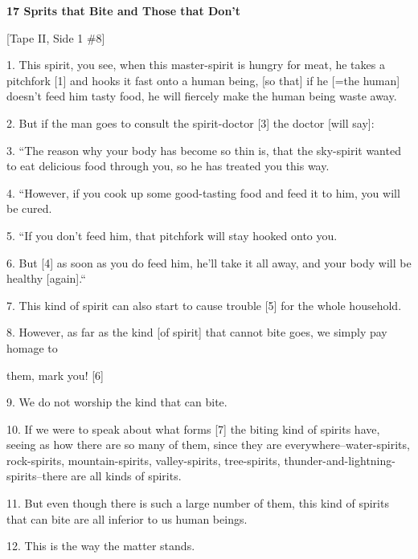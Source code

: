 
{\Large{}\textbf{17 Sprits that Bite and Those that Don't}}

{\Large{}[Tape II, Side 1 \#8]}

{\Large{}1. This spirit, you see, when this master-spirit is hungry for meat, he
takes a pitchfork [1] and hooks it fast onto a human being, [so that] if he [=the
human] doesn't feed him tasty food, he will fiercely make the human being waste
away.}

{\Large{}2. But if the man goes to consult the spirit-doctor [3] the doctor [will
say]:}

{\Large{}3. ``The reason why your body has become so thin is, that the
sky-spirit wanted to eat delicious food through you, so he has treated you this
way. }

{\Large{}4. ``However, if you cook up some good-tasting food and feed it
to him, you will be cured. }

{\Large{}5. ``If you don't feed him, that pitchfork will stay hooked onto
you. }

{\Large{}6. But [4] as soon as you do feed him, he'll take it all away, and your
body will be healthy [again].``}

{\Large{}7. This kind of spirit can also start to cause trouble [5] for the whole
household. }

{\Large{}8. However, as far as the kind [of spirit] that cannot bite goes, we simply
pay homage to }

{\Large{}them, mark you! [6] }

{\Large{}9. We do not worship the kind that can bite. }

{\Large{}10. If we were to speak about what forms [7] the biting kind of spirits
have, seeing as how there are so many of them, since they are everywhere--water-spirits,
rock-spirits, mountain-spirits, valley-spirits, tree-spirits, thunder-and-lightning-spirits--there
are all kinds of spirits.}

{\Large{}11. But even though there is such a large number of them, this kind of
spirits that can bite are all inferior to us human beings. }

{\Large{}12. This is the way the matter stands.  }

